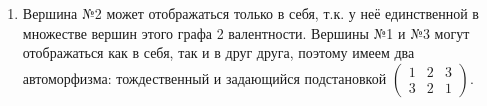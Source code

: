 \begin{enumerate}
    \item 
    \begin{claim*}
        Вершина №2 может отображаться только в себя, т.к. у неё единственной в множестве вершин этого графа
        2 валентности. Вершины №1 и №3 могут отображаться как в себя, так и в друг друга, поэтому имеем два автоморфизма:
        тождественный и задающийся подстановкой 
        $\begin{pmatrix}
            1&2&3\\
            3&2&1
        \end{pmatrix}$.


\end{claim*}
\end{enumerate}
